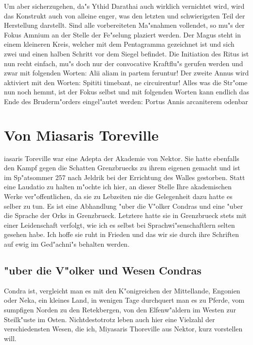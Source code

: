 \documentclass[a5paper,8pt]{book}
\begin{document}
Um aber sicherzugehen, da"s Ythid Darathai auch wirklich vernichtet wird, wird das Konstrukt auch von alleine enger, was den letzten und schwierigsten Teil der Herstellung darstellt.
Sind alle vorbereiteten Ma"snahmen vollendet, so mu"s der Fokus Amnium an der Stelle der Fe"selung plaziert werden. Der Magus steht in einem kleineren Kreis, welcher mit dem Pentagramma gezeichnet ist und sich zwei und einen halben Schritt vor dem Siegel befindet.
Die Initiation des Ritus ist nun recht einfach, mu"s doch nur der convocative Kraftflu"s gerufen werden und zwar mit folgenden Worten:
Alii aliam in partem feruntur!
Der zweite Annus wird aktiviert mit den Worten:
Spititi timebant, ne circuirentur!
Alles was die Str"ome nun noch hemmt, ist der Fokus selbst und mit folgenden Worten kann endlich das Ende des Bruderm"orders eingel"autet werden:
Portus Annis arcaniterem odenbar 

\newpage

\section{ Von Miasaris Toreville}

iasaris Toreville war eine Adepta der Akademie von Nektor. Sie hatte ebenfalls den Kampf gegen die Schatten Grenzbruecks zu ihrem eigenen gemacht und ist im Sp"atsommer 257 nach Jeldrik bei der Errichtung des Walles gestorben.
Statt eine Laudatio zu halten m"ochte ich hier, an dieser Stelle Ihre akademischen Werke ver"offentlichen, da sie zu Lebzeiten nie die Gelegenheit dazu hatte es selber zu tun. Es ist eine Abhandlung "uber die V"olker Condras und eine "uber die Sprache der Orks in Grenzbrueck. Letztere hatte sie in Grenzbrueck stets mit einer Leidenschaft verfolgt, wie ich es selbst bei Sprachwi"senschaftlern selten gesehen habe. Ich hoffe sie ruht in Frieden und das wir sie durch ihre Schriften auf ewig im Ged"achni"s behalten werden.

\subsection{ "uber die V"olker und Wesen Condras}

Condra ist, vergleicht man es mit den K"onigreichen der Mittellande, Engonien oder Neka, ein kleines Land, in wenigen Tage durchquert man es zu Pferde, vom sumpfigen Norden zu den Retekbergen, von den Elfenw"aldern im Westen zur Steilk"uste im Osten. Nichtdestotrotz leben auch hier eine Vielzahl der verschiedensten Wesen, die ich, Miyasaris Thoreville aus Nektor, kurz vorstellen will. 
\end{document}
